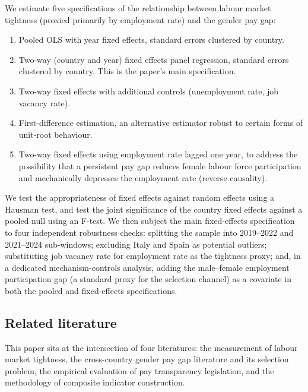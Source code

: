 \documentclass[12pt,a4paper]{article}
\begin{document}
We estimate five specifications of the relationship between labour market
tightness (proxied primarily by employment rate) and the gender pay gap:

\begin{enumerate}
  \item Pooled OLS with year fixed effects, standard errors clustered by country.
  \item Two-way (country and year) fixed effects panel regression, standard
        errors clustered by country.  This is the paper's main specification.
  \item Two-way fixed effects with additional controls (unemployment rate, job
        vacancy rate).
  \item First-difference estimation, an alternative estimator robust to certain
        forms of unit-root behaviour.
  \item Two-way fixed effects using employment rate lagged one year, to address
        the possibility that a persistent pay gap reduces female labour force
        participation and mechanically depresses the employment rate (reverse
        causality).
\end{enumerate}

We test the appropriateness of fixed effects against random effects using a
Hausman test, and test the joint significance of the country fixed effects
against a pooled null using an F-test.  We then subject the main fixed-effects
specification to four independent robustness checks: splitting the sample into
2019--2022 and 2021--2024 sub-windows; excluding Italy and Spain as potential
outliers; substituting job vacancy rate for employment rate as the tightness
proxy; and, in a dedicated mechanism-controls analysis, adding the male--female
employment participation gap (a standard proxy for the
\citealt{OlivettiPetrongolo2008} selection channel) as a covariate in both the
pooled and fixed-effects specifications.

\subsection{Related literature}
\label{subsec:lit}

This paper sits at the intersection of four literatures: the measurement of
labour market tightness, the cross-country gender pay gap literature and its
selection problem, the empirical evaluation of pay transparency legislation, and
the methodology of composite indicator construction.
\end{document}
